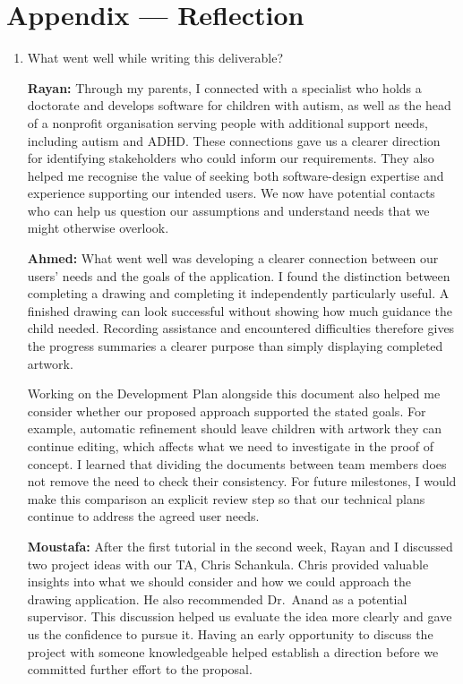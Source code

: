 \documentclass{article}
\begin{document}
\newpage{}

\section*{Appendix --- Reflection}



\begin{enumerate}

\item What went well while writing this deliverable?

\textbf{Rayan:} Through my parents, I connected with a specialist who holds a
doctorate and develops software for children with autism, as well as the head
of a nonprofit organisation serving people with additional support needs,
including autism and ADHD. These connections gave us a clearer direction for
identifying stakeholders who could inform our requirements. They also helped me
recognise the value of seeking both software-design expertise and experience
supporting our intended users. We now have potential contacts who can help us
question our assumptions and understand needs that we might otherwise overlook.

\par\medskip
\textbf{Ahmed:} What went well was developing a clearer
connection between our users' needs and the goals of the application.
I found the distinction between completing a drawing and completing it
independently particularly useful. A finished drawing can look successful
without showing how much guidance the child needed. Recording assistance
and encountered difficulties therefore gives the progress summaries a
clearer purpose than simply displaying completed artwork.

Working on the Development Plan alongside this document also helped me
consider whether our proposed approach supported the stated goals. For
example, automatic refinement should leave children with artwork they
can continue editing, which affects what we need to investigate in the
proof of concept. I learned that dividing the documents between team
members does not remove the need to check their consistency. For future
milestones, I would make this comparison an explicit review step so that
our technical plans continue to address the agreed user needs.

\par\medskip
\textbf{Moustafa:} After the first tutorial in the second week,
Rayan and I discussed two project ideas with our TA, Chris Schankula.
Chris provided valuable insights into what we should consider and how
we could approach the drawing application. He also recommended
Dr.~Anand as a potential supervisor. This discussion helped us evaluate
the idea more clearly and gave us the confidence to pursue it. Having
an early opportunity to discuss the project with someone knowledgeable
helped establish a direction before we committed further effort to the
proposal.


\end{enumerate}
\end{document}
